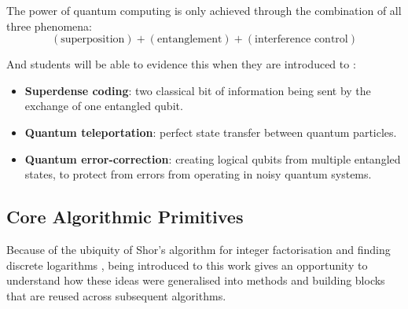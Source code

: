 


The power of quantum computing is only achieved through the combination of all three phenomena:
$$ (\text{superposition})+(\text{entanglement})+(\text{interference control})$$

And students will be able to evidence this when they are introduced to :
\begin{itemize}
	\item \textbf{Superdense coding}: two classical bit of information being sent by the exchange of one entangled qubit.
	\item \textbf{Quantum teleportation}: perfect state transfer between quantum particles.
	\item \textbf{Quantum error-correction}: creating logical qubits from multiple entangled states, 
	to protect from errors from operating in noisy quantum systems.
\end{itemize}

\subsection{Core Algorithmic Primitives}

Because of the ubiquity of Shor's algorithm for integer factorisation and finding discrete logarithms \cite{Shor:1997},
being introduced to this work gives an opportunity to understand how these ideas were generalised into methods
and building blocks that are reused across subsequent algorithms.

